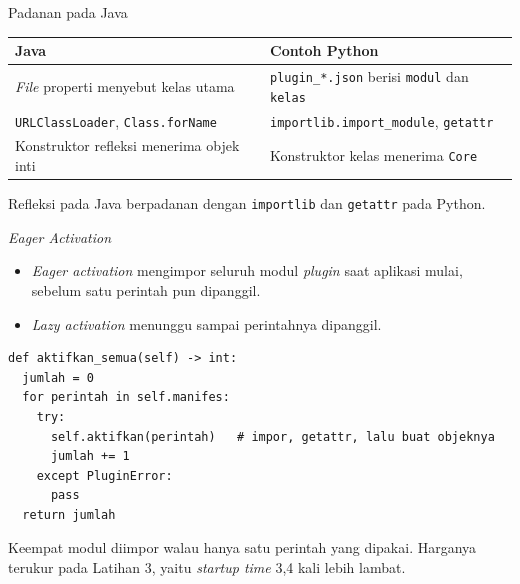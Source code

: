 \documentclass[aspectratio=169, table, 12pt]{beamer}
\begin{document}
\begin{frame}{{\Large Padanan pada Java}}
  \vspace{8pt}
  \centering
  \small
  \begin{tabularx}{0.95\textwidth}{|X|X|}
    \hline
    \textbf{Java} & \textbf{Contoh Python} \\
    \hline
    \textit{File} properti menyebut kelas utama & \texttt{plugin\_*.json} berisi \texttt{modul} dan \texttt{kelas} \\
    \hline
    \texttt{URLClassLoader}, \texttt{Class.forName} & \texttt{importlib.import\_module}, \texttt{getattr} \\
    \hline
    Konstruktor refleksi menerima objek inti & Konstruktor kelas menerima \texttt{Core} \\
    \hline
  \end{tabularx}

  \vspace{8pt}
  {\small Refleksi pada Java berpadanan dengan \texttt{importlib} dan
  \texttt{getattr} pada Python.}
\end{frame}

\begin{frame}[fragile]{{\Large \textit{Eager Activation}}}
  \vspace{4pt}
  \begin{itemize}\small
    \item \textit{Eager activation} mengimpor seluruh modul \textit{plugin} saat
          aplikasi mulai, sebelum satu perintah pun dipanggil.
    \item \textit{Lazy activation} menunggu sampai perintahnya dipanggil.
  \end{itemize}

  \vspace{4pt}
\begin{lstlisting}[style=PythonStyle]
def aktifkan_semua(self) -> int:
  jumlah = 0
  for perintah in self.manifes:
    try:
      self.aktifkan(perintah)   # impor, getattr, lalu buat objeknya
      jumlah += 1
    except PluginError:
      pass
  return jumlah
\end{lstlisting}

  \vspace{4pt}
  {\small Keempat modul diimpor walau hanya satu perintah yang dipakai.
  Harganya terukur pada Latihan 3, yaitu \textit{startup time} 3,4 kali lebih
  lambat.}
\end{frame}
\end{document}
